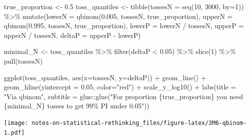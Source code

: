 \documentclass[
]{book}
\newenvironment{Shaded}{\begin{snugshade}}{\end{snugshade}}
\newcommand{\AttributeTok}[1]{\textcolor[rgb]{0.77,0.63,0.00}{#1}}
\newcommand{\DecValTok}[1]{\textcolor[rgb]{0.00,0.00,0.81}{#1}}
\newcommand{\FloatTok}[1]{\textcolor[rgb]{0.00,0.00,0.81}{#1}}
\newcommand{\FunctionTok}[1]{\textcolor[rgb]{0.00,0.00,0.00}{#1}}
\newcommand{\NormalTok}[1]{#1}
\newcommand{\OtherTok}[1]{\textcolor[rgb]{0.56,0.35,0.01}{#1}}
\newcommand{\SpecialCharTok}[1]{\textcolor[rgb]{0.00,0.00,0.00}{#1}}
\newcommand{\StringTok}[1]{\textcolor[rgb]{0.31,0.60,0.02}{#1}}
\begin{document}
\begin{Shaded}
\begin{Highlighting}[]
\NormalTok{true\_proportion }\OtherTok{\textless{}{-}} \FloatTok{0.5}
\NormalTok{toss\_quantiles }\OtherTok{\textless{}{-}} 
  \FunctionTok{tibble}\NormalTok{(}\AttributeTok{tossesN =} \FunctionTok{seq}\NormalTok{(}\DecValTok{10}\NormalTok{, }\DecValTok{3000}\NormalTok{, }\AttributeTok{by=}\DecValTok{1}\NormalTok{)) }\SpecialCharTok{\%\textgreater{}\%}
  \FunctionTok{mutate}\NormalTok{(}\AttributeTok{lowerN =} \FunctionTok{qbinom}\NormalTok{(}\FloatTok{0.005}\NormalTok{, tossesN, true\_proportion),}
         \AttributeTok{upperN =} \FunctionTok{qbinom}\NormalTok{(}\FloatTok{0.995}\NormalTok{, tossesN, true\_proportion),}
         \AttributeTok{lowerP =}\NormalTok{ lowerN }\SpecialCharTok{/}\NormalTok{ tossesN,}
         \AttributeTok{upperP =}\NormalTok{ upperN }\SpecialCharTok{/}\NormalTok{ tossesN,}
         \AttributeTok{deltaP =}\NormalTok{ upperP }\SpecialCharTok{{-}}\NormalTok{ lowerP)}

\NormalTok{minimal\_N }\OtherTok{\textless{}{-}} 
\NormalTok{  toss\_quantiles }\SpecialCharTok{\%\textgreater{}\%}
  \FunctionTok{filter}\NormalTok{(deltaP }\SpecialCharTok{\textless{}} \FloatTok{0.05}\NormalTok{) }\SpecialCharTok{\%\textgreater{}\%}
  \FunctionTok{slice}\NormalTok{(}\DecValTok{1}\NormalTok{) }\SpecialCharTok{\%\textgreater{}\%}
  \FunctionTok{pull}\NormalTok{(tossesN)}

\FunctionTok{ggplot}\NormalTok{(toss\_quantiles, }\FunctionTok{aes}\NormalTok{(}\AttributeTok{x=}\NormalTok{tossesN, }\AttributeTok{y=}\NormalTok{deltaP)) }\SpecialCharTok{+} 
  \FunctionTok{geom\_line}\NormalTok{() }\SpecialCharTok{+} 
  \FunctionTok{geom\_hline}\NormalTok{(}\AttributeTok{yintercept =} \FloatTok{0.05}\NormalTok{, }\AttributeTok{color=}\StringTok{"red"}\NormalTok{) }\SpecialCharTok{+} 
  \FunctionTok{scale\_y\_log10}\NormalTok{() }\SpecialCharTok{+} 
  \FunctionTok{labs}\NormalTok{(}\AttributeTok{title =} \StringTok{"Via qbinom"}\NormalTok{,}
       \AttributeTok{subtitle =}\NormalTok{ glue}\SpecialCharTok{::}\FunctionTok{glue}\NormalTok{(}\StringTok{"For proportion \{true\_proportion\} you need \{minimal\_N\} tosses to get 99\% PI under 0.05"}\NormalTok{))}
\end{Highlighting}
\end{Shaded}

\texttt{[image: notes-on-statistical-rethinking\_files/figure-latex/3M6-qbinom-1.pdf]}
\end{document}

